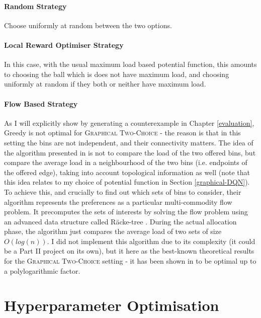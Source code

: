 \paragraph{Random Strategy} Choose uniformly at random between the two options.



\paragraph{Local Reward Optimiser Strategy} In this case, with the usual maximum load based potential function, this amounts to choosing the ball which is does not have maximum load, and choosing uniformly at random if they both or neither have maximum load.


\paragraph{Flow Based Strategy}

As I will explicitly show by generating a counterexample in Chapter \ref{evaluation}, Greedy is not optimal for \textsc{Graphical Two-Choice} - the reason is that in this setting the bins are not independent, and their connectivity matters. The idea of the algorithm presented in \cite{bansal2021twochoicegraphical} is not to compare the load of the two offered bins, but compare the average load in a neighbourhood of the two bins (i.e. endpoints of the offered edge), taking into account topological information as well (note that this idea relates to my choice of potential function in Section \ref{graphical-DQN}). To achieve this, and crucially to find out which sets of bins to consider, their algorithm represents the preferences as a particular multi-commodity flow problem. It precomputes the sets of interests by solving the flow problem using an advanced data structure called R\"{a}cke-tree \cite{racke2008racketree}. During the actual allocation phase, the algorithm just compares the average load of two sets of size $O(log(n))$. I did not implement this algorithm due to its complexity (it could be a Part II project on its own), but it here as the best-known theoretical results for the \textsc{Graphical Two-Choice} setting - it has been shown in \cite{bansal2021twochoicegraphical} to be optimal up to a polylogarithmic factor.



\section{Hyperparameter Optimisation}

